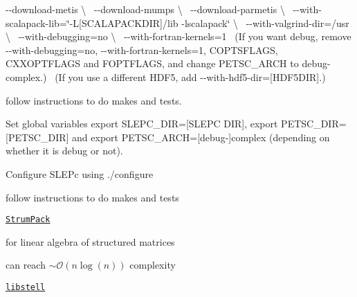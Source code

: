 \begin{DoxyItemize}
\begin{DoxyItemize}
\begin{DoxyEnumerate}
 {\ttfamily -\/-\/download-\/metis \textbackslash{}}~\newline
 {\ttfamily -\/-\/download-\/mumps \textbackslash{}}~\newline
 {\ttfamily -\/-\/download-\/parmetis \textbackslash{}}~\newline
 {\ttfamily -\/-\/with-\/scalapack-\/lib=\char`\"{}-\/\+L\mbox{[}\+S\+C\+A\+L\+A\+P\+A\+C\+K\+D\+I\+R\mbox{]}/lib -\/lscalapack\char`\"{} \textbackslash{}}~\newline
 {\ttfamily -\/-\/with-\/valgrind-\/dir=/usr \textbackslash{}}~\newline
 {\ttfamily -\/-\/with-\/debugging=no \textbackslash{}}~\newline
 {\ttfamily -\/-\/with-\/fortran-\/kernels=1}~\newline
 (If you want debug, remove {\ttfamily -\/-\/with-\/debugging=no}, {\ttfamily -\/-\/with-\/fortran-\/kernels=1}, C\+O\+P\+T\+S\+F\+L\+A\+GS, C\+X\+X\+O\+P\+T\+F\+L\+A\+GS and F\+O\+P\+T\+F\+L\+A\+GS, and change P\+E\+T\+S\+C\+\_\+\+A\+R\+CH to {\ttfamily debug-\/complex}.)~\newline
 (If you use a different H\+D\+F5, add {\ttfamily -\/-\/with-\/hdf5-\/dir=\mbox{[}H\+D\+F5\+D\+IR\mbox{]}}.)
\item follow instructions to do makes and tests.
\item Set global variables {\ttfamily export S\+L\+E\+P\+C\+\_\+\+D\+IR=\mbox{[}S\+L\+E\+PC D\+IR\mbox{]}}, {\ttfamily export P\+E\+T\+S\+C\+\_\+\+D\+IR=\mbox{[}P\+E\+T\+S\+C\+\_\+\+D\+IR\mbox{]}} and {\ttfamily export P\+E\+T\+S\+C\+\_\+\+A\+R\+CH=\mbox{[}debug-\/\mbox{]}complex} (depending on whether it is debug or not).
\item Configure S\+L\+E\+Pc using {\ttfamily ./configure}
\item follow instructions to do makes and tests
\end{DoxyEnumerate}
\end{DoxyItemize}
\item \href{http://portal.nersc.gov/project/sparse/strumpack/}{\tt Strum\+Pack}
\begin{DoxyItemize}
\item for linear algebra of structured matrices \cite{Ambikasaran2013}
\item can reach $\sim \mathcal{O} (n \log(n))$ complexity
\end{DoxyItemize}
\item \href{http://vmecwiki.pppl.wikispaces.net/STELLOPT+Compilation}{\tt libstell}
\begin{DoxyItemize}

\end{DoxyItemize}
\end{DoxyItemize}
